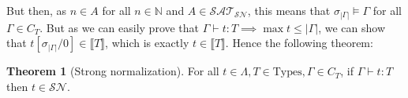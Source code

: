 \documentclass{article}
\newcommand{\SN}[0]{\mathcal{SN}}
\newcommand{\bN}[0]{\mathbb N}
\newcommand{\Types}[0]{\mathrm{Types}}
\newcommand{\SAT}[0]{\mathcal{SAT}_{\mathcal{SN}}}
\theoremstyle{definition}
\newtheorem{them}{Theorem}
\begin{document}
But then, as $n\in A$ for all $n\in\bN$ and $A\in \SAT$, this means that $\sigma_{|\Gamma|} \models\Gamma$
for all $\Gamma\in C_T$. But as we can easily prove that $\Gamma\vdash t : T \implies \max t \leq |\Gamma|$,
we can show that $t[\sigma_{|\Gamma|}/0]\in \llbracket T\rrbracket$, which is exactly
$t\in \llbracket T \rrbracket$. Hence the following theorem:

\begin{them}[Strong normalization]
    For all $t\in\Lambda,T\in\Types,\Gamma\in C_T$, if $\Gamma\vdash t : T$ then $t\in \SN$.
\end{them}



\end{document}
